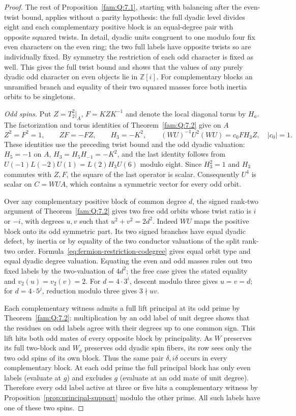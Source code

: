 \documentclass[11pt,a4paper]{article}
\numberwithin{equation}{section}
\theoremstyle{remark}
\newcommand{\ZZ}{\mathbb Z}
\begin{document}
\begin{proof}
The rest of Proposition~\ref{fam:Q:7.1}, starting with balancing after the
even-twist bound, applies without a parity hypothesis: the full dyadic
level divides eight and each complementary positive block is an
equal-degree pair with opposite squared twists. In detail, dyadic
units congruent to one modulo four fix even characters on the even
ring; the two full labels have opposite twists so are individually
fixed. By symmetry the restriction of each odd character is fixed as
well. This gives the full twist bound and shows that the values of
any purely dyadic odd character on even objects lie in $\ZZ[i]$.
For complementary blocks an unramified branch and equality of their
two squared masses force both inertia orbits to be singletons.

\smallskip\noindent\emph{Odd spins.} Put $Z=T_2^2|_A$,
$F=KZK^{-1}$ and denote the local diagonal torus by $H_a$.
The factorization and torus identities of Theorem~\ref{fam:Q:7.2} give on $A$
\[
 Z^2=F^2=1,\qquad ZF=-FZ,\qquad H_3=-K^2,\qquad
 (WU)^{-1}U^2(WU)=c_0 F H_3 Z,\quad |c_0|=1.
\]
These identities use the preceding twist bound and the odd dyadic
valuation: $H_5=-1$ on $A$, $H_3=H_5 H_{-1}=-K^2$, and the last identity follows from
$U(-1)L(-2)U(1)=L(2)H_3U(6)$ modulo eight. Since $H_3^2=1$ and
$H_3$ commutes with $Z,F$, the square of the last operator is scalar.
Consequently $U^4$ is scalar on $C=WUA$, which contains a symmetric
vector for every odd orbit.

Over any complementary positive block of common degree $d$, the
signed rank-two argument of Theorem~\ref{fam:Q:7.2} gives two free odd
orbits whose twist ratio is $i$ or $-i$, with degrees $u,v$ such
that $u^2+v^2=2d^2$. Indeed $WU$ maps the positive block onto its
odd symmetric part. Its two signed branches have equal dyadic defect,
by inertia or by equality of the two conductor valuations of the
split rank-two order. Formula~\eqref{eq:fermion-restriction-codegree} gives equal orbit type
and equal dyadic degree valuation. Equating the even and odd masses
rules out two fixed labels by the two-valuation of $4d^2$; the free
case gives the stated equality and $v_2(u)=v_2(v)=2$.
For $d=4\cdot3^i$, descent modulo three gives $u=v=d$; for
$d=4\cdot5^j$, reduction modulo three gives $3\nmid uv$.

Each complementary witness admits a full lift principal at its odd
prime by Theorem~\ref{fam:Q:7.2}: multiplication by an odd label of
unit degree shows that the residues on odd labels agree with their
degrees up to one common sign. This lift hits both odd mates of every
opposite block by principality. As $W$ preserves its full two-block
and $W_o$ preserves odd dyadic spin fibers, its row sees only the
two odd spins of its own block. Thus the same pair $\delta,i\delta$
occurs in every complementary block. At each odd prime the full
principal block has only even labels (evaluate at $g$) and excludes
$g$ (evaluate at an odd mate of unit degree). Therefore every odd
label active at three or five hits a complementary witness by
Proposition~\ref{prop:principal-support} modulo the other prime. All such labels have
one of these two spins.


\end{proof}
\end{document}
